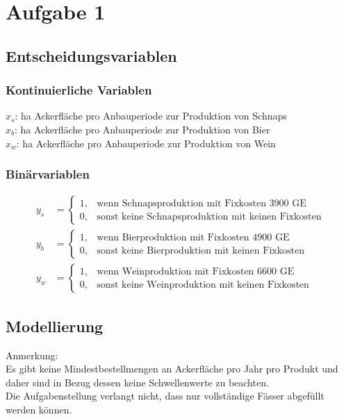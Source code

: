 \documentclass[a4paper,11pt]{article}
\begin{document}
\raggedright %

\section*{Aufgabe 1}

\subsection*{Entscheidungsvariablen} 
\subsubsection*{Kontinuierliche Variablen}
$x_{s}$: ha Ackerfläche pro Anbauperiode zur Produktion von Schnaps \\
$x_{b}$: ha Ackerfläche pro Anbauperiode zur Produktion von Bier \\
$x_{w}$: ha Ackerfläche pro Anbauperiode zur Produktion von Wein \\
\bigbreak

\subsubsection*{Binärvariablen}
\begin{align*}
y_s &= \begin{cases}
    1, & \text{wenn Schnapsproduktion mit Fixkosten 3900 GE} \\
    0, & \text{sonst keine Schnapsproduktion mit keinen Fixkosten}
\end{cases} \\
y_b &= \begin{cases}
    1, & \text{wenn Bierproduktion mit Fixkosten 4900 GE} \\
    0, & \text{sonst keine Bierproduktion mit keinen Fixkosten}
\end{cases} \\
y_w &= \begin{cases}
    1, & \text{wenn Weinproduktion mit Fixkosten 6600 GE} \\
    0, & \text{sonst keine Weinproduktion mit keinen Fixkosten}
\end{cases}
\end{align*}

\subsection*{Modellierung}
Anmerkung: \\
Es gibt keine Mindestbestellmengen an Ackerfläche pro Jahr pro Produkt und daher sind in Bezug dessen keine Schwellenwerte zu beachten. \\
Die Aufgabenstellung verlangt nicht, dass nur vollständige Fässer abgefüllt werden können.
\end{document}
